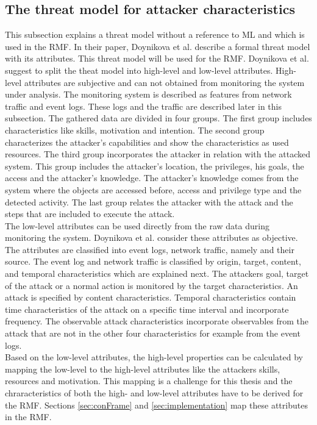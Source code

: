 \subsection{The threat model for attacker characteristics}
\label{sec:threat}

This subsection explains a threat model without a reference to ML and which is used in the RMF. In their paper, Doynikova et al. \cite{DBLP:conf/crisis/DoynikovaNGK20} describe a formal threat model with its attributes. This threat model will be used for the RMF. Doynikova et al. suggest to split the theat model into high-level and low-level attributes.
High-level attributes are subjective and can not obtained from monitoring the system under analysis. The monitoring system is described as features from network traffic and event logs. These logs and the traffic are described later in this subsection. The gathered data are divided in four groups. The first group includes characteristics like
skills, motivation and intention. The second group characterizes the attacker's capabilities and show the characteristics as used resources. The third group incorporates the attacker in
relation with the attacked system. This group includes the attacker's location, the privileges, his goals, the access and the attacker's knowledge. The attacker's knowledge comes from the
system where the objects are accessed before, access and privilege type and the detected activity. The last group relates the attacker with the attack and the steps that are included to
execute the attack. \\
The low-level attributes can be used directly from the raw data during monitoring the system. Doynikova et al. consider these attributes as objective. The attributes are classified into event logs, network traffic, namely and their source. The event log and network traffic is classified by origin, target, content, and temporal characteristics \cite{DBLP:journals/ijcysa/FraunholzKAS17} which are explained next. The attackers
goal, target of the attack or a normal action is monitored by the target characteristics. An attack is specified by content characteristics. Temporal
characteristics contain time characteristics of the attack on a specific time interval and incorporate frequency. The observable attack characteristics incorporate observables from the attack that are not in the other four characteristics for example from the event logs. \\
Based on the low-level attributes, the high-level properties can be calculated by mapping the low-level to the high-level attributes like the attackers skills, resources and motivation. This mapping is a challenge for this thesis and the chraracteristics of both the high- and low-level attributes have to be derived for the RMF. Sections \ref{sec:conFrame} and \ref{sec:implementation} map these attributes in the RMF.


